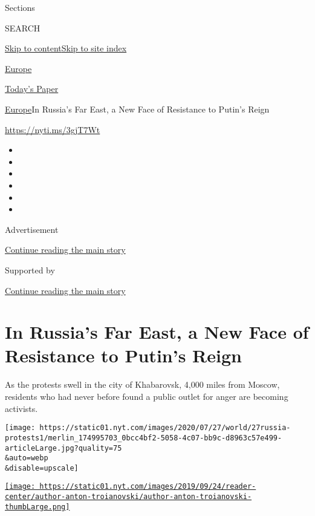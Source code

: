 Sections

SEARCH

\protect\hyperlink{site-content}{Skip to
content}\protect\hyperlink{site-index}{Skip to site index}

\href{https://www.nytimes.com/section/world/europe}{Europe}

\href{https://myaccount.nytimes.com/auth/login?response_type=cookie\&client_id=vi}{}

\href{https://www.nytimes.com/section/todayspaper}{Today's Paper}

\href{/section/world/europe}{Europe}\textbar{}In Russia's Far East, a
New Face of Resistance to Putin's Reign

\url{https://nyti.ms/3gjT7Wt}

\begin{itemize}
\item
\item
\item
\item
\item
\item
\end{itemize}

Advertisement

\protect\hyperlink{after-top}{Continue reading the main story}

Supported by

\protect\hyperlink{after-sponsor}{Continue reading the main story}

\hypertarget{in-russias-far-east-a-new-face-of-resistance-to-putins-reign}{%
\section{In Russia's Far East, a New Face of Resistance to Putin's
Reign}\label{in-russias-far-east-a-new-face-of-resistance-to-putins-reign}}

As the protests swell in the city of Khabarovsk, 4,000 miles from
Moscow, residents who had never before found a public outlet for anger
are becoming activists.

\texttt{[image: https://static01.nyt.com/images/2020/07/27/world/27russia-protests1/merlin\_174995703\_0bcc4bf2-5058-4c07-bb9c-d8963c57e499-articleLarge.jpg?quality=75\\\&auto=webp\\\&disable=upscale]}

\href{https://www.nytimes.com/by/anton-troianovski}{\texttt{[image: https://static01.nyt.com/images/2019/09/24/reader-center/author-anton-troianovski/author-anton-troianovski-thumbLarge.png]}}

